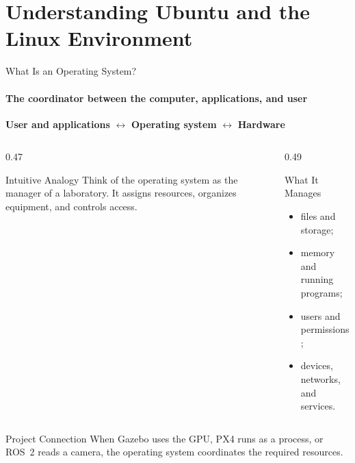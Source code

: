 
\section{Understanding Ubuntu and the Linux Environment}


\begin{frame}{What Is an Operating System?}
\framesubtitle{The coordinator between the computer, applications, and user}

\begin{center}
    \textbf{User and applications}
    \(\longleftrightarrow\)
    \textbf{Operating system}
    \(\longleftrightarrow\)
    \textbf{Hardware}
\end{center}

\pause

\begin{columns}[T,onlytextwidth]
    \begin{column}{0.47\textwidth}
        \begin{block}{Intuitive Analogy}
            Think of the operating system as the manager of a laboratory.
            It assigns resources, organizes equipment, and controls access.
        \end{block}
    \end{column}
    \hfill
    \begin{column}{0.49\textwidth}
        \begin{block}{What It Manages}
            \begin{itemize}
                \item files and storage;
                \item memory and running programs;
                \item users and permissions;
                \item devices, networks, and services.
            \end{itemize}
        \end{block}
    \end{column}
\end{columns}

\begin{exampleblock}{Project Connection}
    When Gazebo uses the GPU, PX4 runs as a process, or ROS~2 reads a camera,
    the operating system coordinates the required resources.
\end{exampleblock}
\end{frame}



